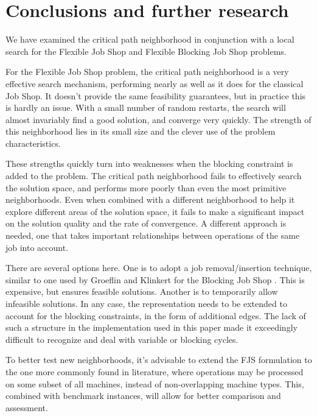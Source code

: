 \documentclass[a4paper,11pt]{article}
\begin{document}
\section{Conclusions and further research}

We have examined the critical path neighborhood in conjunction with a local search for the Flexible Job Shop and Flexible Blocking Job Shop problems.

For the Flexible Job Shop problem, the critical path neighborhood is a very effective search mechanism, performing nearly as well as it does for the classical Job Shop. It doesn't provide the same feasibility guarantees, but in practice this is hardly an issue. With a small number of random restarts, the search will almost invariably find a good solution, and converge very quickly. The strength of this neighborhood lies in its small size and the clever use of the problem characteristics.

These strengths quickly turn into weaknesses when the blocking constraint is added to the problem. The critical path neighborhood fails to effectively search the solution space, and performs more poorly than even the most primitive neighborhoods. Even when combined with a different neighborhood to help it explore different areas of the solution space, it fails to make a significant impact on the solution quality and the rate of convergence. A different approach is needed, one that takes important relationships between operations of the same job into account.

There are several options here. One is to adopt a job removal/insertion technique, similar to one used by Groeflin and Klinkert for the Blocking Job Shop \cite{lsn-bjs}. This is expensive, but ensures feasible solutions. Another is to temporarily allow infeasible solutions. In any case, the representation needs to be extended to account for the blocking constraints, in the form of additional edges. The lack of such a structure in the implementation used in this paper made it exceedingly difficult to recognize and deal with variable or blocking cycles.

To better test new neighborhoods, it's advisable to extend the FJS formulation to the one more commonly found in literature, where operations may be processed on some subset of all machines, instead of non-overlapping machine types. This, combined with benchmark instances, will allow for better comparison and assessment.

\printbibliography[heading=bibintoc]
\end{document}
